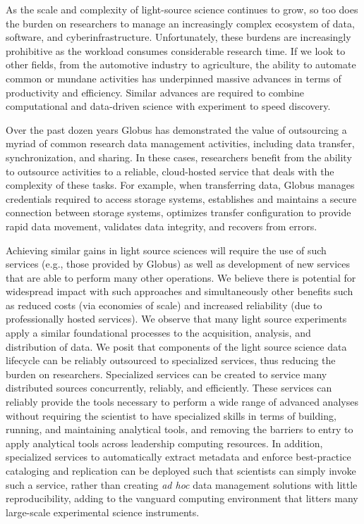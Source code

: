 \documentclass{aip-cp}
\newcommand\ian[1]{}
\newcommand\ryan[1]{}
\newcommand\ian[1]{{\color{red}[Ian: #1]}}
\newcommand\ryan[1]{{\color{green}[Ryan: #1]}}
\begin{document}
%


As the scale and complexity of light-source science continues to grow, so too
does the burden on researchers to manage an increasingly complex ecosystem of
data, software, and cyberinfrastructure.  Unfortunately, these burdens are
increasingly prohibitive as the workload consumes considerable
research time. If we look to other fields, from the automotive
industry to agriculture, the ability to automate common or mundane activities has
underpinned massive advances in terms of productivity and efficiency. Similar
advances are required to combine computational and data-driven science with
experiment to speed discovery.

Over the past dozen years Globus has demonstrated the value of outsourcing
a myriad of common research data management activities, including data 
transfer, synchronization, and sharing. In these cases, researchers benefit
from the ability to outsource activities to a reliable, cloud-hosted
service that deals with the complexity of these tasks. For example, 
when transferring data, Globus manages credentials required to access
storage systems, establishes and maintains a secure connection between
storage systems, optimizes transfer configuration to provide rapid
data movement, validates data integrity, and recovers from errors. 

Achieving similar gains in light source sciences will require 
the use of such services (e.g., those provided by Globus) as 
well as development of new services that are able to perform 
many other operations.  We believe there is potential for widespread
impact with such approaches and simultaneously other benefits
such as reduced costs (via economies of scale) and increased reliability
(due to professionally hosted services). We observe that many 
light source experiments apply a similar foundational processes to the acquisition,
analysis, and  distribution of data. We posit that components of the light
source science data lifecycle can be reliably outsourced to specialized
services, thus reducing the burden on researchers. Specialized services can be
created to service many distributed sources concurrently, reliably, and efficiently.
These services can reliably provide the tools necessary to  perform a wide
range of advanced analyses without requiring the scientist to have specialized
skills in terms of building, running, and maintaining analytical tools, and
removing the barriers to entry to apply analytical tools across leadership
computing resources. In addition, specialized services to automatically
extract metadata and enforce best-practice cataloging and replication can be
deployed such that scientists can simply invoke such a service, rather than
creating \emph{ad hoc} data management solutions with little reproducibility, adding
to the vanguard computing environment that litters many large-scale
experimental science instruments.
\end{document}
